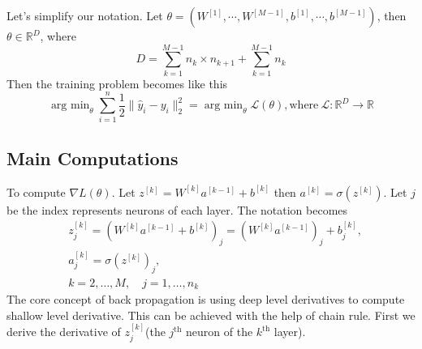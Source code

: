 \documentclass{article}
\DeclareMathOperator*{\argmin}{arg~min}
\begin{document}
            Let's simplify our notation. Let $\theta=(W^{ [1] },\cdots,W^{
                [M-1] },b^{ [1] },\cdots,b^{ [M-1] })$, then
                $\theta\in\mathbb{R}^D$, where
            \[
                D = \sum_{k=1}^{M-1} n_k \times n_{k+1} + \sum_{k=1}^{M-1} n_k
            \]
            Then the training problem becomes like this
            \begin{equation*}
                \argmin_\theta \sum_{i=1}^n \frac{1}{2} \| \hat{y}_{i} - y_i
                \|_2^2 = \argmin_\theta \mathcal{L}(\theta)
                ,\mathrm{where~} \mathcal{L}:\mathbb{R}^D \rightarrow \mathbb{R}
            \end{equation*}

        \subsection{Main Computations}
            To compute $\nabla L(\theta)$. Let $z^{ [k] } = W^{ [k] } a^{ [k-1] } + b^{ [k] }$ then $a^{ [k] } = \sigma(z^{ [k] })$.
            Let $j$ be the index represents neurons of each layer. The notation becomes
            \begin{align*}
                & z_j^{[k]}=(W^{[k]}a^{[k-1]}+b^{[k]})_j=(W^{[k]}a^{[k-1]})_j+b_j^{[k]}, \\
                & a_j^{[k]}=\sigma(z^{[k]})_j, \\
                & k=2,\dots,M,\quad j=1,\dots,n_k
            \end{align*}
            The core concept of back propagation is using deep level derivatives to compute shallow level derivative. This can be achieved with the help of chain rule. First we derive the derivative of $z^{[k]}_j$(the $j^\mathrm{th}$ neuron of the $k^\mathrm{th}$ layer).
\end{document}

